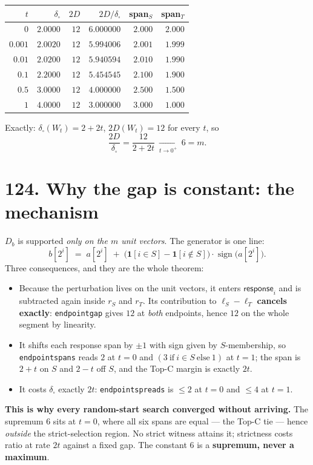 \documentclass[9pt,twocolumn]{article}
\renewcommand{\_}{\CIGunderscore\allowbreak}
\begin{document}
\begin{center}\scriptsize
\begin{tabularx}{0.98\columnwidth}{r r r r r r}
\toprule
$t$ & $\delta_\square$ & $2D$ & $2D/\delta_\square$ & span$_S$ & span$_T$\\
\midrule
$0$ & $2.0000$ & $12$ & $\mathbf{6.000000}$ & $2.000$ & $2.000$\\
$0.001$ & $2.0020$ & $12$ & $5.994006$ & $2.001$ & $1.999$\\
$0.01$ & $2.0200$ & $12$ & $5.940594$ & $2.010$ & $1.990$\\
$0.1$ & $2.2000$ & $12$ & $5.454545$ & $2.100$ & $1.900$\\
$0.5$ & $3.0000$ & $12$ & $4.000000$ & $2.500$ & $1.500$\\
$1$ & $4.0000$ & $12$ & $3.000000$ & $3.000$ & $1.000$\\
\bottomrule
\end{tabularx}
\end{center}

Exactly: $\delta_\square(W_t)=2+2t$, $2D(W_t)=12$ for every $t$, so
\[\frac{2D}{\delta_\square}=\frac{12}{2+2t}\ \xrightarrow[t\to0^+]{}\ 6=m .\]

\section*{124. Why the gap is constant: the mechanism}
$D_b$ is supported \emph{only on the $m$ unit vectors}. The generator is one line:
\[b[2^i] \;=\; a[2^i]\;+\;\bigl(\mathbf{1}[i\in S]-\mathbf{1}[i\notin S]\bigr)\cdot\operatorname{sign}\bigl(a[2^i]\bigr).\]
Three consequences, and they are the whole theorem:
\begin{itemize}
\item Because the perturbation lives on the unit vectors, it enters $\textsf{response}_i$ and is subtracted again inside $r_S$ and $r_T$. Its contribution to $\ell_S-\ell_T$ \textbf{cancels exactly}: \texttt{endpoint\_gap} gives $12$ at \emph{both} endpoints, hence $12$ on the whole segment by linearity.
\item It shifts each response span by $\pm1$ with sign given by $S$-membership, so \texttt{endpoint\_spans} reads $2$ at $t=0$ and $(3\ \text{if}\ i\in S\ \text{else}\ 1)$ at $t=1$; the span is $2+t$ on $S$ and $2-t$ off $S$, and the Top-C margin is exactly $2t$.
\item It costs $\delta_\square$ exactly $2t$: \texttt{endpoint\_spreads} is $\le2$ at $t=0$ and $\le4$ at $t=1$.
\end{itemize}
\textbf{This is why every random-start search converged without arriving.} The supremum $6$ sits at $t=0$, where all six spans are equal --- the Top-C tie --- hence \emph{outside} the strict-selection region. No strict witness attains it; strictness costs ratio at rate $2t$ against a fixed gap. The constant $6$ is a \textbf{supremum, never a maximum}.
\end{document}

